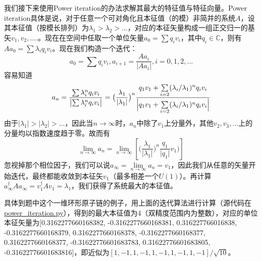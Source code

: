 \documentclass[UTF8,size=9.5]{ctexart}
\begin{document}
我们接下来使用Power iteration的办法求解其最大的特征值与特征向量。Power iteration具体是说，对于任意一个可对角化且本征值（的模）非简并的系统$A$，设其本征值（按模长排列）为$\lambda_1>\lambda_2>...$，对应的本征矢量构成一组正交归一的基矢${v_1,v_2,....}$。现在在空间中任取一个单位矢量$a_0=\sum q_iv_i$，其中$q_i\in\mathds{C}$，则有$Aa_0=\sum \lambda_iq_iv_i$。现在我们构造一个迭代：
\[a_0=\sum q_iv_i,a_{i+1}=\frac{Aa_i}{\bigl\lvert Aa_i\bigr\rvert},i=0,1,2,...\]
容易知道
\[a_n=\frac{\sum \lambda_i^n q_i v_i}{\bigl\lvert\sum \lambda_i^n q_i v_i\bigr\rvert}=\bigl(\frac{\lambda_1}{\lvert\lambda_1\rvert}\bigr)^n\frac{q_1v_1+\sum\limits_{i=2}(\lambda_i/\lambda_1)^nq_iv_i}{\Bigl\lvert q_1v_1+\sum\limits_{i=2}(\lambda_i/\lambda_1)^nq_iv_i\Bigr\rvert}\]
由于$\lvert\lambda_1\rvert>\lvert\lambda_2\rvert>...$，因此当$n\rightarrow\infty$时，$a_n$中除了$v_1$上分量外，其他$v_2,v_3,...$上的分量均以指数速度趋于零。故而有
\[\lim\limits_{n\rightarrow\infty}a_n=\lim\limits_{n\rightarrow\infty}[\bigl(\frac{\lambda_1}{\lvert\lambda_1\rvert}\bigr)^n\frac{q_1}{\lvert q_1\rvert}v_1)]\]
忽视掉那个相位因子，我们可以说$a_{\infty}=\lim\limits_{n\rightarrow\infty}a_n=v_1$，因此我们从任意的矢量开始迭代，最终都能收敛到本征矢$v_1$（最多相差一个$U(1)$）。再计算$a_\infty^\dag A a_\infty=v_1^\dag A v_1=\lambda_1$，我们获得了系统最大的本征值。

具体到题中这个一维环形原子链的例子，用上面的迭代算法进行计算（源代码在\href{./power_iteration.py}{power\_iteration.py}），得到的最大本征值为\num{4}（双精度范围内为整数），对应的单位本征矢量为[0.3162277660168382, -0.3162277660168381, 0.316227766016838, -0.3162277660168379, 0.3162277660168378, -0.3162277660168377, 0.3162277660168377, -0.31622776601683783, 0.31622776601683805, -0.31622776601683816]，即近似为$[1,-1,1,-1,1,-1,1,-1,1,-1]/\sqrt{10}$。
\end{document}
